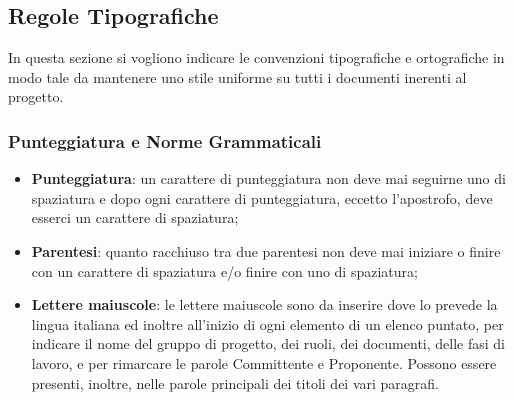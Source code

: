 \subsection{Regole Tipografiche}
In questa sezione si vogliono indicare le convenzioni tipografiche e ortografiche in modo tale da mantenere uno stile uniforme su tutti i documenti inerenti al progetto.

\subsubsection{Punteggiatura e Norme Grammaticali}

\begin{itemize}
\item \textbf{Punteggiatura}: un carattere di punteggiatura non deve mai seguirne uno di spaziatura e dopo ogni carattere di punteggiatura, eccetto l'apostrofo, deve esserci un carattere di spaziatura;
\item \textbf{Parentesi}: quanto racchiuso tra due parentesi non deve mai iniziare o finire con un carattere di spaziatura e/o finire con uno di spaziatura;
\item \textbf{Lettere maiuscole}: le lettere maiuscole sono da inserire dove lo prevede la lingua italiana ed inoltre all'inizio di ogni elemento di un elenco puntato, per indicare il nome del gruppo di progetto, dei ruoli, dei documenti, delle fasi di lavoro, e per rimarcare le parole Committente e Proponente. Possono essere presenti, inoltre, nelle parole principali dei titoli dei vari paragrafi.
\end{itemize}

